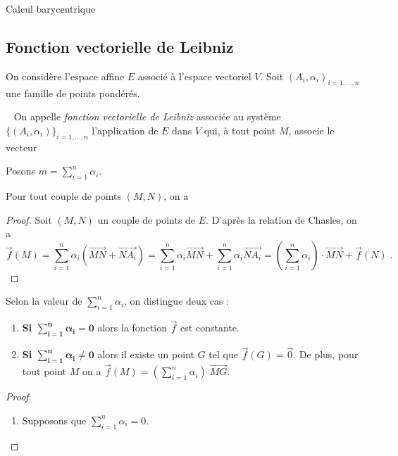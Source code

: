 \begin{chapter}{Calcul barycentrique}
\subsection{Fonction vectorielle de Leibniz}
%
On consid\`ere l'espace affine $E$ associ\'e \`a l'espace vectoriel $V$. 
Soit $(A_i , \alpha_i)_{i = 1 , \dots , n}$ une famille de points pond\'er\'es.
\begin{defi} ~ \newline
On appelle \emph{fonction vectorielle de Leibniz} associ\'ee au syst\`eme
$\{(A_i,\alpha_i)\}_{i=1,\dots,n}$ l'application de $E$ dans $V$ qui, \`a tout point $M$, associe le vecteur
\end{defi}
%
Posons $m = \sum_{i = 1}^{n} \alpha_i$.
%
\begin{prp}
	\label{prp:f(M) = f(N) + m MN}
	Pour tout couple de points $(M , N)$, on a 
	\begin{proof}
		Soit $(M,N)$ un couple de points de $E$.
		D'apr\`es la relation de Chasles, on a 
			\begin{displaymath}
			\vec{f}(M) = \sum_{i = 1}^n \alpha_i ( \overrightarrow{MN} + \overrightarrow{NA_i} ) 
				= \sum_{i = 1}^n \alpha_i  \overrightarrow{MN} + \sum_{i = 1}^n \alpha_i \overrightarrow{NA_i} 
				= \left( \sum_{i = 1}^n \alpha_i \right) \cdot \overrightarrow{MN} + \vec{f}(N)           
			\; .
			\end{displaymath}
	\end{proof}
\end{prp}
%
\begin{prp} \label{prp:fonction vectorielle}
	Selon la valeur de $\sum_{i = 1}^{n} \alpha_i$, on distingue deux cas : 
	\begin{enumerate}
	\item \textbf{Si $\mathbold{\sum_{i = 1}^{n} \alpha_i = 0}$ } alors la fonction $\vec{f}$ est constante.
	\item \label{prp: fonction vectorielle 2}
		\textbf{Si $\mathbold{\sum_{i = 1}^{n} \alpha_i \neq 0}$ } alors il existe un point $G$ tel que $\vec{f}(G) = \vec{0}$. De plus, pour tout point $M$ on a $\vec{f}(M) = (\sum_{i = 1}^{n} \alpha_i) \; \overrightarrow{MG}$.
	\end{enumerate}
	\begin{proof}
		\begin{enumerate}
			\item Supposons que $\sum_{i = 1}^{n} \alpha_i = 0$. 

\end{enumerate}
\end{proof}
\end{prp}
\end{chapter}
